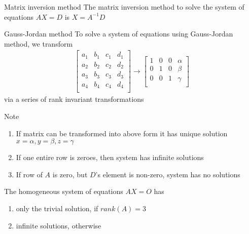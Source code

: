 \documentclass[titlepage, 12pt]{book}
\begin{document}
\begin{definition}{Matrix inversion method}{}
    The matrix inversion method to solve the system of equations $AX = D$ is $X
    = A^{-1}D$
\end{definition}

\begin{definition}{Gauss-Jordan method}{}
    To solve a system of equations using Gauss-Jordan method, we transform
    \begin{align*}
        \begin{bmatrix}
            a_1 & b_1 & c_1 & d_1\\
            a_2 & b_2 & c_2 & d_2\\
            a_3 & b_3 & c_3 & d_3\\
            a_4 & b_4 & c_4 & d_4\\
        \end{bmatrix}
        \rightarrow 
        \begin{bmatrix}
            1 & 0 & 0 & \alpha\\
            0 & 1 & 0 & \beta\\
            0 & 0 & 1 & \gamma\\
        \end{bmatrix}
    \end{align*}
    via a series of rank invariant transformations
\end{definition}
Note
\begin{enumerate}
    \item If matrix can be transformed into above form it has unique solution $x
        = \alpha, y = \beta, z = \gamma$
    \item If one entire row is zeroes, then system has infinite solutions
    \item If row of $A$ is zero, but $D$'s element is non-zero, system has no
        solutions
\end{enumerate}

\begin{theorem}{}{}
    The homogeneous system of equations $AX = O$ has
    \begin{enumerate}
        \item only the trivial solution, if $rank(A) = 3$
        \item infinite solutions, otherwise
    \end{enumerate}
\end{theorem}

\end{document}
